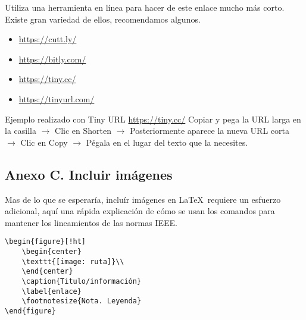 Utiliza una herramienta en línea para hacer de este enlace mucho más corto. Existe gran variedad de ellos, recomendamos algunos.

\begin{itemize}
    \item \url{https://cutt.ly/}
    \item \url{https://bitly.com/}
    \item \url{https://tiny.cc/}
    \item \url{https://tinyurl.com/}
\end{itemize}
			 			

Ejemplo realizado con Tiny URL \url{https://tiny.cc/} 
Copiar y pega la URL larga en la casilla $\to$ Clic en Shorten $\to$ Posteriormente aparece la nueva URL corta $\to$ Clic en Copy $\to$ Pégala en el lugar del texto que la necesites.


\subsection*{Anexo C. Incluir imágenes}

Mas de lo que se esperaría, incluír imágenes en \LaTeX\  requiere un esfuerzo adicional, aquí una rápida explicación de cómo se usan los comandos para mantener los lineamientos de las normas IEEE.
\newpage

\begin{verbatim}
\begin{figure}[!ht]
    \begin{center}
    \texttt{[image: ruta]}\\
    \end{center}
    \caption{Titulo/información}
    \label{enlace}
    \footnotesize{Nota. Leyenda}
\end{figure}
\end{verbatim}


